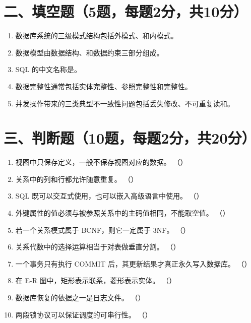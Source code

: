 \documentclass{../../note}
\begin{document}
\section*{二、填空题（5题，每题2分，共10分）}

\begin{enumerate}[itemsep=0.8em]
\item 数据库系统的三级模式结构包括外模式、\underline{\hspace{2cm}}和内模式。
\item 数据模型由数据结构、\underline{\hspace{2cm}}和数据约束三部分组成。
\item SQL 的中文名称是\underline{\hspace{3cm}}。
\item 数据完整性通常包括实体完整性、参照完整性和\underline{\hspace{2cm}}完整性。
\item 并发操作带来的三类典型不一致性问题包括丢失修改、不可重复读和\underline{\hspace{2cm}}。
\end{enumerate}

\section*{三、判断题（10题，每题2分，共20分）}

\begin{enumerate}[itemsep=0.6em]
\item 视图中只保存定义，一般不保存视图对应的数据。 （\hspace{0.8cm}）
\item 关系中的列和行都允许随意重复。 （\hspace{0.8cm}）
\item SQL 既可以交互式使用，也可以嵌入高级语言中使用。 （\hspace{0.8cm}）
\item 外键属性的值必须与被参照关系中的主码值相同，不能取空值。 （\hspace{0.8cm}）
\item 若一个关系模式属于 BCNF，则它一定属于 3NF。 （\hspace{0.8cm}）
\item 关系代数中的选择运算相当于对表做垂直分割。 （\hspace{0.8cm}）
\item 一个事务只有执行 COMMIT 后，其更新结果才真正永久写入数据库。 （\hspace{0.8cm}）
\item 在 E-R 图中，矩形表示联系，菱形表示实体。 （\hspace{0.8cm}）
\item 数据库恢复的依据之一是日志文件。 （\hspace{0.8cm}）
\item 两段锁协议可以保证调度的可串行性。 （\hspace{0.8cm}）
\end{enumerate}
\end{document}
